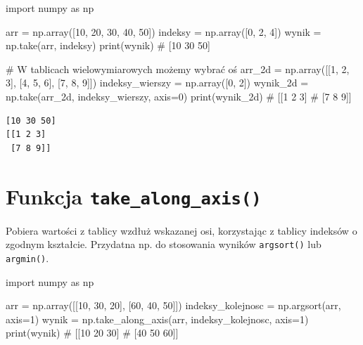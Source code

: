 \documentclass[
  polish,
  letterpaper,
  DIV=11,
  numbers=noendperiod]{scrreprt}
\newenvironment{Shaded}{\begin{snugshade}}{\end{snugshade}}
\newcommand{\BuiltInTok}[1]{\textcolor[rgb]{0.00,0.23,0.31}{#1}}
\newcommand{\CommentTok}[1]{\textcolor[rgb]{0.37,0.37,0.37}{#1}}
\newcommand{\DecValTok}[1]{\textcolor[rgb]{0.68,0.00,0.00}{#1}}
\newcommand{\ImportTok}[1]{\textcolor[rgb]{0.00,0.46,0.62}{#1}}
\newcommand{\NormalTok}[1]{\textcolor[rgb]{0.00,0.23,0.31}{#1}}
\newcommand{\OperatorTok}[1]{\textcolor[rgb]{0.37,0.37,0.37}{#1}}
\begin{document}
\begin{Shaded}
\begin{Highlighting}[]
\ImportTok{import}\NormalTok{ numpy }\ImportTok{as}\NormalTok{ np}

\NormalTok{arr }\OperatorTok{=}\NormalTok{ np.array([}\DecValTok{10}\NormalTok{, }\DecValTok{20}\NormalTok{, }\DecValTok{30}\NormalTok{, }\DecValTok{40}\NormalTok{, }\DecValTok{50}\NormalTok{])}
\NormalTok{indeksy }\OperatorTok{=}\NormalTok{ np.array([}\DecValTok{0}\NormalTok{, }\DecValTok{2}\NormalTok{, }\DecValTok{4}\NormalTok{])}
\NormalTok{wynik }\OperatorTok{=}\NormalTok{ np.take(arr, indeksy)}
\BuiltInTok{print}\NormalTok{(wynik)  }\CommentTok{\# [10 30 50]}

\CommentTok{\# W tablicach wielowymiarowych możemy wybrać oś}
\NormalTok{arr\_2d }\OperatorTok{=}\NormalTok{ np.array([[}\DecValTok{1}\NormalTok{, }\DecValTok{2}\NormalTok{, }\DecValTok{3}\NormalTok{], [}\DecValTok{4}\NormalTok{, }\DecValTok{5}\NormalTok{, }\DecValTok{6}\NormalTok{], [}\DecValTok{7}\NormalTok{, }\DecValTok{8}\NormalTok{, }\DecValTok{9}\NormalTok{]])}
\NormalTok{indeksy\_wierszy }\OperatorTok{=}\NormalTok{ np.array([}\DecValTok{0}\NormalTok{, }\DecValTok{2}\NormalTok{])}
\NormalTok{wynik\_2d }\OperatorTok{=}\NormalTok{ np.take(arr\_2d, indeksy\_wierszy, axis}\OperatorTok{=}\DecValTok{0}\NormalTok{)}
\BuiltInTok{print}\NormalTok{(wynik\_2d)}
\CommentTok{\# [[1 2 3]}
\CommentTok{\#  [7 8 9]]}
\end{Highlighting}
\end{Shaded}

\begin{verbatim}
[10 30 50]
[[1 2 3]
 [7 8 9]]
\end{verbatim}

\section{\texorpdfstring{Funkcja
\texttt{take\_along\_axis()}}{Funkcja take\_along\_axis()}}\label{funkcja-take_along_axis}

Pobiera wartości z tablicy wzdłuż wskazanej osi, korzystając z tablicy
indeksów o zgodnym kształcie. Przydatna np. do stosowania wyników
\texttt{argsort()} lub \texttt{argmin()}.

\begin{Shaded}
\begin{Highlighting}[]
\ImportTok{import}\NormalTok{ numpy }\ImportTok{as}\NormalTok{ np}

\NormalTok{arr }\OperatorTok{=}\NormalTok{ np.array([[}\DecValTok{10}\NormalTok{, }\DecValTok{30}\NormalTok{, }\DecValTok{20}\NormalTok{], [}\DecValTok{60}\NormalTok{, }\DecValTok{40}\NormalTok{, }\DecValTok{50}\NormalTok{]])}
\NormalTok{indeksy\_kolejnosc }\OperatorTok{=}\NormalTok{ np.argsort(arr, axis}\OperatorTok{=}\DecValTok{1}\NormalTok{)}
\NormalTok{wynik }\OperatorTok{=}\NormalTok{ np.take\_along\_axis(arr, indeksy\_kolejnosc, axis}\OperatorTok{=}\DecValTok{1}\NormalTok{)}
\BuiltInTok{print}\NormalTok{(wynik)}
\CommentTok{\# [[10 20 30]}
\CommentTok{\#  [40 50 60]]}
\end{Highlighting}
\end{Shaded}
\end{document}
